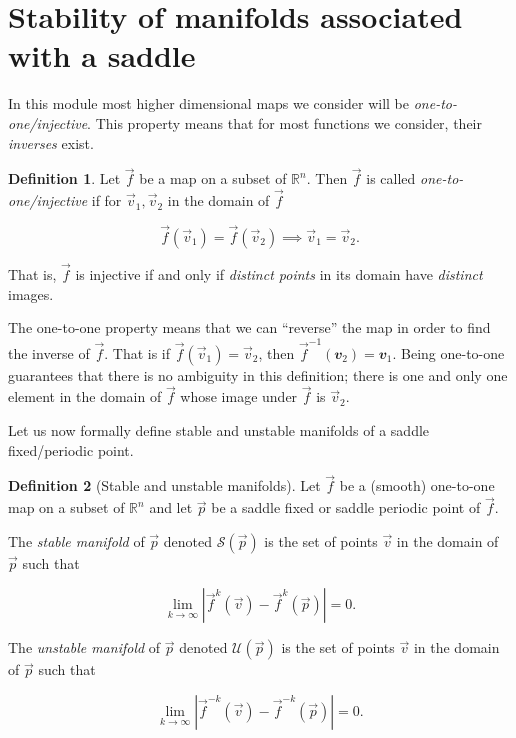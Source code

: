 \documentclass[
  a4paper,
  oneside,
  final]{krantz}
\newcommand{\R}{\mathbb{R}}
\renewcommand{\v}[1]{{\mathbfit{#1}}}
\newcommand{\stab}[1]{\mathcal{S}(#1)}
\newcommand{\unstab}[1]{\mathcal{U}(#1)}
\theoremstyle{definition}
\newtheorem{definition}{Definition}[chapter]
\theoremstyle{definition}
\theoremstyle{definition}
\theoremstyle{definition}
\theoremstyle{remark}
\begin{document}
\hypertarget{stabilityofmanifolds}{%
\section{Stability of manifolds associated with a saddle}\label{stabilityofmanifolds}}

In this module most higher dimensional maps we consider will be \emph{one-to-one/injective}. This property means that for most functions we consider, their \emph{inverses} exist.

\begin{definition}
\protect\hypertarget{def:onetoone}{}\label{def:onetoone}Let \(\vec{f}\) be a map on a subset of \(\R^{n}\). Then \(\vec{f}\) is called \emph{one-to-one/injective} if for \(\vec{v}_1, \vec{v}_2\) in the domain of \(\vec{f}\)

\[ \vec{f}(\vec{v}_1) = \vec{f}(\vec{v}_2) \implies \vec{v}_1 = \vec{v}_2.\]

That is, \(\vec{f}\) is injective if and only if \emph{distinct points} in its domain have \emph{distinct} images.
\end{definition}

The one-to-one property means that we can ``reverse'' the map in order to find the inverse of \(\vec{f}\). That is if \(\vec{f}(\vec{v}_1) = \vec{v}_2\), then \(\vec{f}^{-1}(\v{v}_2) = \v{v}_1\). Being one-to-one guarantees that there is no ambiguity in this definition; there is one and only one element in the domain of \(\vec{f}\) whose image under \(\vec{f}\) is \(\vec{v}_2\).

Let us now formally define stable and unstable manifolds of a saddle fixed/periodic point.

\begin{definition}[Stable and unstable manifolds]
\protect\hypertarget{def:stableunstablemanifolds}{}\label{def:stableunstablemanifolds}Let \(\vec{f}\) be a (smooth) one-to-one map on a subset of \(\R^{n}\) and let \(\vec{p}\) be a saddle fixed or saddle periodic point of \(\vec{f}\).

The \emph{stable manifold} of \(\vec{p}\) denoted \(\stab{\vec{p}}\) is the set of points \(\vec{v}\) in the domain of \(\vec{p}\) such that

\[ \lim_{k \to \infty} |\vec{f}^{k}(\vec{v}) - \vec{f}^{k}(\vec{p})| = 0. \]

The \emph{unstable manifold} of \(\vec{p}\) denoted \(\unstab{\vec{p}}\) is the set of points \(\vec{v}\) in the domain of \(\vec{p}\) such that

\[ \lim_{k \to \infty} |\vec{f}^{-k}(\vec{v}) - \vec{f}^{-k}(\vec{p})| = 0. \]
\end{definition}
\end{document}
